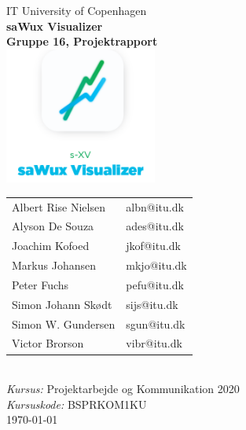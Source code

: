 \begin{titlepage} 
    \begin{center}
        {\LARGE IT University of Copenhagen}\\[1.5cm]
        \linespread{1.2}\huge {\bfseries saWux Visualizer}\\
        \linespread{1.2}\large {\bfseries Gruppe 16, Projektrapport}\\[1.5cm] %
        \linespread{1}
        \includegraphics[width=5cm]{Images/logo.png}\\[1cm]  %
        {\large
        \begin{tabular}{R{0.465\textwidth}  L{0.465\textwidth}}
            Albert Rise Nielsen & albn@itu.dk\\
            Alyson De Souza 	& ades@itu.dk\\
            Joachim Kofoed 	    & jkof@itu.dk\\
            Markus Johansen 	& mkjo@itu.dk\\
            Peter Fuchs 	    & pefu@itu.dk\\
            Simon Johann Skødt	& sijs@itu.dk\\
            Simon W. Gundersen 	& sgun@itu.dk\\
            Victor Brorson 	    & vibr@itu.dk
        \end{tabular}}\\[1cm]

        {\large \emph{Kursus:} Projektarbejde og Kommunikation 2020}\\
        {\large \emph{Kursuskode:} BSPRKOM1KU}\\[1cm]
        \today
    \end{center}        
\end{titlepage}
